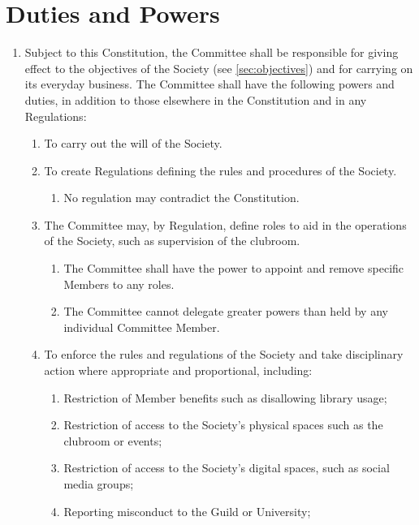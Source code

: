\documentclass[a4paper]{article}
\begin{document}
\section{Duties and Powers} \label{sec:duties}
\begin{enumerate}
    \item Subject to this Constitution, the Committee shall be responsible for giving effect to the objectives of the Society (see \cref{sec:objectives}) and for carrying on its everyday business. The Committee shall have the following powers and duties, in addition to those elsewhere in the Constitution and in any Regulations:
        \begin{enumerate}
            \item To carry out the will of the Society.
            \item To create Regulations defining the rules and procedures of the Society.
            \begin{enumerate}
                \item No regulation may contradict the Constitution.
            \end{enumerate}
            \item The Committee may, by Regulation, define roles to aid in the operations of the Society, such as supervision of the clubroom.
            \begin{enumerate}
                \item The Committee shall have the power to appoint and remove specific Members to any roles.
                \item The Committee cannot delegate greater powers than held by any individual Committee Member.
            \end{enumerate}
            \item \label{item:disciplinary_action} To enforce the rules and regulations of the Society and take disciplinary action where appropriate and proportional, including:
            \begin{enumerate}
                \item Restriction of Member benefits such as disallowing library usage;
                \item Restriction of access to the Society’s physical spaces such as the clubroom or events;
                \item Restriction of access to the Society’s digital spaces, such as social media groups;
                \item Reporting misconduct to the Guild or University;

\end{enumerate}
\end{enumerate}
\end{enumerate}
\end{document}
